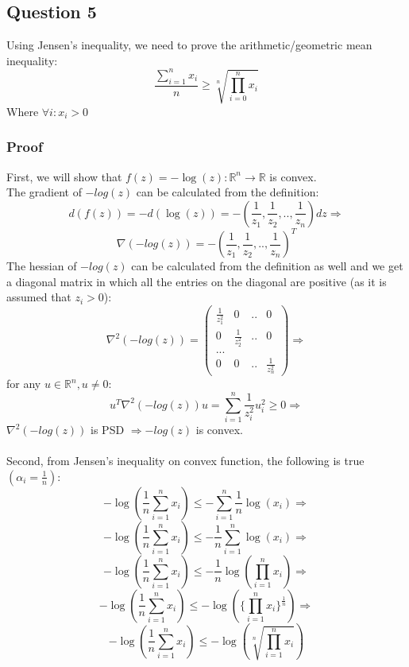 \documentclass[12pt]{article}
\begin{document}
\subsection{Question 5}
Using Jensen’s inequality, we need to prove the arithmetic/geometric mean inequality:
$$\frac{\sum_{i=1}^n x_i}{n} \geq \sqrt[n]{\prod_{i=0}^n x_i}$$
Where $\forall i : x_i >0$
\subsubsection*{Proof}
First, we will show that $f(z)=-\log{(z)}:\mathbb{R}^n \rightarrow \mathbb{R}$ is convex.\\
The gradient of $-log(z)$ can be calculated from the definition:\\
$$d(f(z)) = -d(\log{(z)}) = -(\frac{1}{z_1},\frac{1}{z_2},..,\frac{1}{z_n})dz\Rightarrow$$
$$\nabla (-log(z)) = -(\frac{1}{z_1},\frac{1}{z_2},..,\frac{1}{z_n})^T$$
The hessian of $-log(z)$ can be calculated from the definition as well and we get a diagonal matrix in which all the entries on the diagonal are positive (as it is assumed that $z_i > 0$):\\
$$
\nabla^2 (-log(z)) =
\begin{pmatrix}
    \frac{1}{z_1^2} & 0 & .. & 0 \\
    0 & \frac{1}{z_2^2} & .. & 0\\
    ...\\
    0 & 0 &  .. & \frac{1}{z_n^2}
\end{pmatrix}
\Rightarrow$$
for any $u \in \mathbb{R}^n, u \neq 0$:\\
$$u^T \nabla^2 (-log(z)) u = \sum_{i=1}^n \frac{1}{z_i^2} u_i^2 \geq 0 \Rightarrow$$
$\nabla^2 (-log(z))$ is PSD $\Rightarrow -log(z)$ is convex.\\ 
\\
Second, from Jensen's inequality on convex function, the following is true $(\alpha_i = \frac{1}{n})$:\\
$$-\log(\frac{1}{n} \sum_{i=1}^n x_i) \leq -\sum_{i=1}^n \frac{1}{n} \log(x_i) \Rightarrow$$
$$-\log(\frac{1}{n} \sum_{i=1}^n x_i) \leq -\frac{1}{n} \sum_{i=1}^n \log(x_i) \Rightarrow$$
$$-\log(\frac{1}{n} \sum_{i=1}^n x_i) \leq -\frac{1}{n} \log(\prod_{i=1}^n x_i) \Rightarrow$$
$$-\log(\frac{1}{n} \sum_{i=1}^n x_i) \leq -\log(\{\prod_{i=1}^n x_i\}^\frac{1}{n}) \Rightarrow$$
$$-\log(\frac{1}{n} \sum_{i=1}^n x_i) \leq -\log(\sqrt[n]{\prod_{i=1}^n x_i})$$
\end{document}
